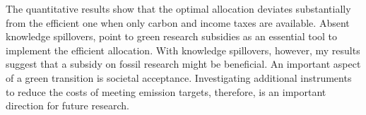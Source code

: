 The quantitative results show that the optimal allocation deviates substantially from the efficient one when only carbon and income taxes are available. Absent knowledge spillovers, \cite{Acemoglu2012TheChange} point to green research subsidies as an essential tool to implement the efficient allocation. With knowledge spillovers, however, my results suggest that a subsidy on fossil research might be beneficial. An important aspect of a green transition is societal acceptance. Investigating additional instruments to reduce the costs of meeting emission targets, therefore, is an important direction for future research.

\clearpage

